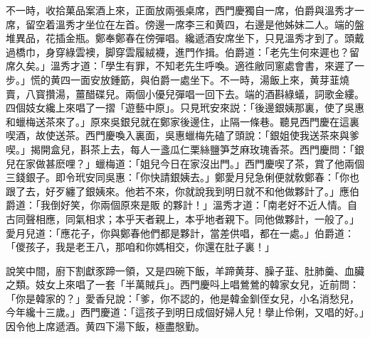 不一時，收拾菓品案酒上來，正面放兩張桌席，西門慶獨自一席，伯爵與溫秀才一席，留空着溫秀才坐位在左首。傍邊一席李三和黄四，右邊是他姊妹二人。端的盤堆異品，花插金瓶。鄭奉鄭春在傍彈唱。纔遞酒安席坐下，只見溫秀才到了。頭戴過橋巾，身穿綠雲襖，脚穿雲履絨襪，進門作揖。伯爵道：「老先生何來遲也？留席久矣。」溫秀才道：「學生有罪，不知老先生呼喚。適徃敝同窻處會書，來遲了一步。」慌的黄四一面安放鍾筯，與伯爵一處坐下。不一時，湯飯上來，黄芽韮燒賣，八寳攢湯，薑醋碟兒。兩個小優兒彈唱一回下去。端的酒斟綠蟻，詞歌金縷。四個妓女纔上來唱了一摺「遊藝中原」。只見玳安來説：「後邊銀姨那裏，使了吳惠和蠟梅送茶來了。」原來吳銀兒就在鄭家後邊住，止隔一條巷。聽見西門慶在這裏喫酒，故使送茶。西門慶喚入裏面，吳惠蠟梅先磕了頭說：「銀姐使我送茶來與爹喫。」揭開盒兒，斟茶上去，每人一盞瓜仁栗絲鹽笋芝麻玫瑰香茶。西門慶問：「銀兒在家做甚麽哩？」蠟梅道：「姐兒今日在家沒出門。」西門慶喫了茶，賞了他兩個三錢銀子。即令玳安同吳惠：「你快請銀姨去。」鄭愛月兒急俐便就敎鄭春：「你也跟了去，好歹纏了銀姨來。他若不來，你就說我到明日就不和他做夥計了。」應伯爵道：「我倒好笑，你兩個原來是販𣭈的夥計！」溫秀才道：「南老好不近人情。自古同聲相應，同氣相求；本乎天者親上，本乎地者親下。同他做夥計，一般了。」愛月兒道：「應花子，你與鄭春他們都是夥計，當差供唱，都在一處。」伯爵道：「儍孩子，我是老王八，那咱和你媽相交，你還在肚子裏！」

說笑中間，廚下割獻豕蹄一領，又是四碗下飯，羊蹄黄芽、臊子韮、肚肺羹、血臟之類。妓女上來唱了一套「半萬賊兵」。西門慶呌上唱鶯鶯的韓家女兒，近前問：「你是韓家的？」愛香兒說：「爹，你不認的，他是韓金釧侄女兒，小名消愁兒，今年纔十三歲。」西門慶道：「這孩子到明日成個好婦人兒！擧止伶俐，又唱的好。」因令他上席遞酒。黄四下湯下飯，極盡慇勤。

